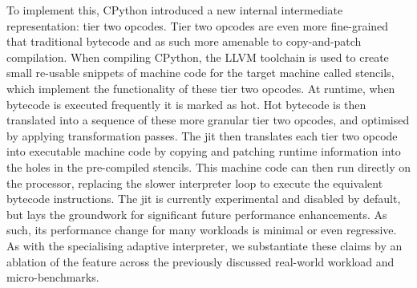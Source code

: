 To implement this, CPython introduced a new internal intermediate representation: tier two opcodes. Tier two opcodes are even more fine-grained that traditional bytecode and as such more amenable to copy-and-patch compilation.
When compiling CPython, the LLVM toolchain is used to create small re-usable snippets of machine code for the target machine called stencils, which implement the functionality of these tier two opcodes. At runtime, when bytecode is executed frequently it is marked as hot. Hot bytecode is then translated into a sequence of these more granular tier two opcodes, and optimised by applying transformation passes. The \ac{jit} then translates each tier two opcode into executable machine code by copying and patching runtime information into the holes in the pre-compiled stencils. This machine code can then run directly on the processor, replacing the slower interpreter loop to execute the equivalent bytecode instructions. %
The \ac{jit} is currently experimental and disabled by default, but lays the groundwork for significant future performance enhancements. As such, its performance change for many workloads is minimal or even regressive.
As with the specialising adaptive interpreter, we substantiate these claims by an ablation of the feature across the previously discussed real-world workload and micro-benchmarks.


